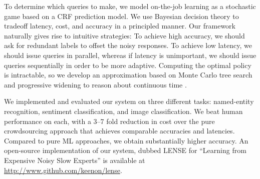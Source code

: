 To determine which queries to make,
we model on-the-job learning as a stochastic game based on a CRF prediction model.
We use Bayesian decision theory to tradeoff latency, cost, and accuracy in a principled manner.
Our framework naturally gives rise to intuitive strategies:
To achieve high accuracy, we should ask for redundant labels
to offset the noisy responses.  To achieve low latency, we should issue queries
in parallel, whereas if latency is unimportant, we should issue queries
sequentially in order to be more adaptive.
Computing the optimal policy is intractable,
so we develop an approximation
based on Monte Carlo tree search \citep{kocsis2006bandit} and
progressive widening to reason about continuous time \citep{coulom2007computing}.

We implemented and evaluated our system on three different tasks: named-entity
recognition, sentiment classification, and image classification.
We beat human performance on each, 
with a 3--7 fold reduction in cost over the pure crowdsourcing approach 
that achieves comparable accuracies and latencies.
Compared to pure ML approaches, we obtain substantially higher accuracy.
An open-source implementation of our system, dubbed LENSE for ``Learning from Expensive Noisy Slow Experts'' is available at
\href{http://www.github.com/keenon/lense}{http://www.github.com/keenon/lense}.


